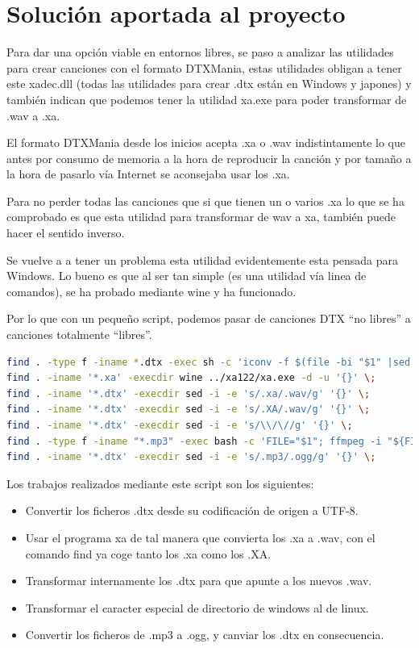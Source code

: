 \documentclass[a4paper,11pt,oneside]{book}
\begin{document}
\section{Solución aportada al proyecto}
Para dar una opción viable en entornos libres, se paso a analizar las utilidades para crear canciones con el formato DTXMania, estas utilidades obligan a tener este xadec.dll (todas las utilidades para crear .dtx están en Windows y japones) y también indican que podemos tener la utilidad xa.exe para poder transformar de .wav a .xa.

El formato DTXMania desde los inicios acepta .xa o .wav indistintamente lo que antes por consumo de memoria a la hora de reproducir la canción y por tamaño a la hora de pasarlo vía Internet se aconsejaba usar los .xa.

Para no perder todas las canciones que si que tienen un o varios .xa lo que se ha comprobado es que esta utilidad para transformar de wav a xa, también puede hacer el sentido inverso.

Se vuelve a  a tener un problema esta utilidad evidentemente esta pensada para Windows.
Lo bueno es que al ser tan simple (es una utilidad vía linea de comandos), se ha probado mediante wine y ha funcionado.

Por lo que con un pequeño script, podemos pasar de canciones DTX ``no libres'' a canciones totalmente ``libres''.


\begin{lstlisting}[language=bash, frame=single]
find . -type f -iname *.dtx -exec sh -c 'iconv -f $(file -bi "$1" |sed -e "s/.*[ ]charset=//") -t utf-8 -o converted "$1" && mv converted "$1"' -- {} \;
find . -iname '*.xa' -execdir wine ../xa122/xa.exe -d -u '{}' \;
find . -iname '*.dtx' -execdir sed -i -e 's/.xa/.wav/g' '{}' \; 
find . -iname '*.dtx' -execdir sed -i -e 's/.XA/.wav/g' '{}' \;
find . -iname '*.dtx' -execdir sed -i -e 's/\\/\//g' '{}' \;
find . -type f -iname "*.mp3" -exec bash -c 'FILE="$1"; ffmpeg -i "${FILE}"  -acodec libvorbis "${FILE%.mp3}.ogg";' _ '{}' \;
find . -iname '*.dtx' -execdir sed -i -e 's/.mp3/.ogg/g' '{}' \; 
\end{lstlisting}

Los trabajos realizados mediante este script son los siguientes:

\begin{itemize}
  \item Convertir los ficheros .dtx desde su codificación de origen a UTF-8.
  \item Usar el programa xa de tal manera que convierta los .xa a .wav, con el comando find ya coge tanto los .xa como los .XA.
  \item Transformar internamente los .dtx para que apunte a los nuevos .wav.
  \item Transformar el caracter especial de directorio de windows al de linux.
  \item Convertir los ficheros de .mp3 a .ogg, y canviar los .dtx en consecuencia.
\end{itemize}
\end{document}
